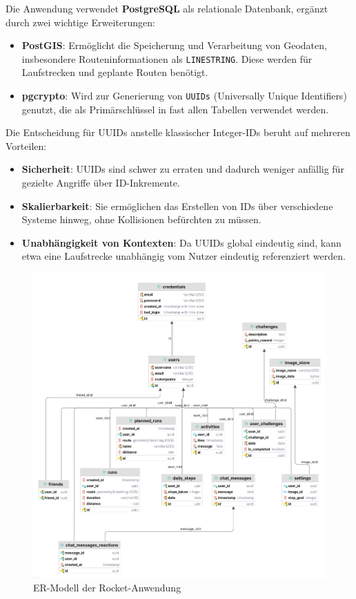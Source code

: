 \documentclass[11pt,a4paper]{article}
\begin{document}
Die Anwendung verwendet \textbf{PostgreSQL}\cite{postgresql} als relationale Datenbank, ergänzt durch zwei wichtige Erweiterungen:

\begin{itemize}
    \item \textbf{PostGIS}: Ermöglicht die Speicherung und Verarbeitung von Geodaten, insbesondere Routeninformationen als \texttt{LINESTRING}. Diese werden für Laufstrecken und geplante Routen benötigt.
    \item \textbf{pgcrypto}: Wird zur Generierung von \texttt{UUIDs} (Universally Unique Identifiers) genutzt, die als Primärschlüssel in fast allen Tabellen verwendet werden.
\end{itemize}

Die Entscheidung für UUIDs anstelle klassischer Integer-IDs beruht auf mehreren Vorteilen:
\begin{itemize}
    \item \textbf{Sicherheit}: UUIDs sind schwer zu erraten und dadurch weniger anfällig für gezielte Angriffe über ID-Inkremente.
    \item \textbf{Skalierbarkeit}: Sie ermöglichen das Erstellen von IDs über verschiedene Systeme hinweg, ohne Kollisionen befürchten zu müssen.
    \item \textbf{Unabhängigkeit von Kontexten}: Da UUIDs global eindeutig sind, kann etwa eine Laufstrecke unabhängig vom Nutzer eindeutig referenziert werden.
\end{itemize}

\begin{figure}[H]
    \centering
    \includegraphics[width=0.8\linewidth]{images/RocketERLight.png}
    \caption{ER-Modell der Rocket-Anwendung}
\end{figure}
\end{document}
